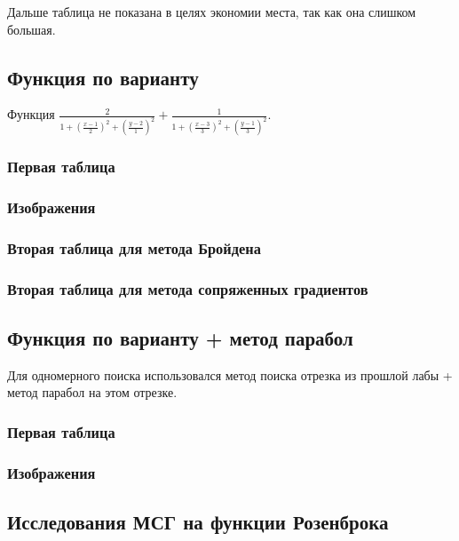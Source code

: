 Дальше таблица не показана в целях экономии места, так как она слишком большая.

\subsection{Функция по варианту}

Функция $\frac{2}{1+\left(\frac{x-1}{2}\right)^2+\left(\frac{y-2}{1}\right)^2} + \frac{1}{1+\left(\frac{x-3}{3}\right)^2+\left(\frac{y-1}{3}\right)^2}$.

\subsubsection{Первая таблица}
\subsubsection{Изображения}
\subsubsection{Вторая таблица для метода Бройдена}
\subsubsection{Вторая таблица для метода сопряженных градиентов}

\subsection{Функция по варианту + метод парабол}

Для одномерного поиска использовался метод поиска отрезка из прошлой лабы + метод парабол на этом отрезке.

\subsubsection{Первая таблица}
\subsubsection{Изображения}

\subsection{Исследования МСГ на функции Розенброка}

